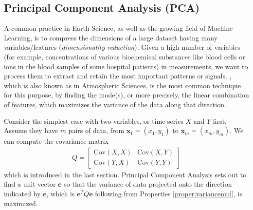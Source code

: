 \subsection{Principal Component Analysis (PCA)}
\label{subsection:PCA}
A common practice in Earth Science, as well as the growing field of Machine Learning, is to compress the dimensions of a large dataset having many variables/features (\textit{dimensionality reduction}). Given a high number of variables (for example, concentrations of various biochemical substances like blood cells or ions in the blood samples of some hospital patients) in measurements, we want to process them to extract and retain the most important patterns or signals. , which is also known as  in Atmospheric Sciences, is the most common technique for this purpose, by finding the mode(s), or more precisely, the linear combination of features, which maximizes the variance of the data along that direction. \par
Consider the simplest case with two variables, or time series $X$ and $Y$ first. Assume they have $m$ pairs of data, from $\textbf{x}_1 = (x_1, y_1)$ to $\textbf{x}_m = (x_{m}, y_{m})$. We can compute the covariance matrix
\begin{align*}
Q = \begin{bmatrix}
\text{Cov}(X, X) & \text{Cov}(X, Y) \\
\text{Cov}(Y, X) & \text{Cov}(Y, Y) 
\end{bmatrix}
\end{align*}
which is introduced in the last section. Principal Component Analysis sets out to find a unit vector $\textbf{e}$ so that the variance of data projected onto the direction indicated by $\textbf{e}$, which is $\textbf{e}^T Q \textbf{e}$ following from Properties \ref{proper:variancemul}, is maximized. \par
